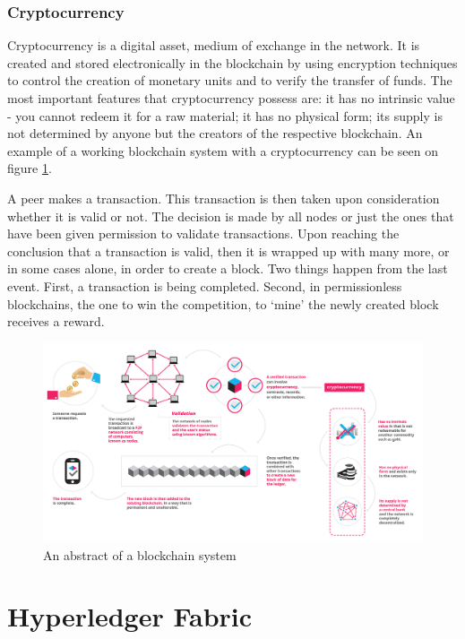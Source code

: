 \documentclass[a4paper,11pt]{report}
\begin{document}
\subsubsection{Cryptocurrency}
Cryptocurrency is a digital asset, medium of exchange in the network. It is created and stored electronically in the blockchain by using encryption techniques to control the creation of monetary units and to verify the transfer of funds. The most important features that cryptocurrency possess are: it has no intrinsic value - you cannot redeem it for a raw material; it has no physical form; its supply is not determined by anyone but the creators of the respective blockchain. \cite{whatIsCryptocurrency}
An example of a working blockchain system with a cryptocurrency can be seen on figure \ref{blockchainAbstract}. 


A peer makes a transaction. This transaction is then taken upon consideration whether it is valid or not. The decision is made by all nodes or just the ones that have been given permission to validate transactions. Upon reaching the conclusion that a transaction is valid,  then it is wrapped up with many more, or in some cases alone, in order to create a block. Two things happen from the last event. First, a transaction is being completed. Second, in permissionless blockchains, the one to win the competition, to ‘mine’ the newly created block receives a reward. 

\begin{figure}[h]
\centering
  \includegraphics[width=16cm]{infographics0517-01-1.png}
  \caption{An abstract of a blockchain system \cite{whatIsBlockgeeks}}
  \label{blockchainAbstract}
\end{figure}


\section{Hyperledger Fabric}
\label{hplFabric}
\end{document}
